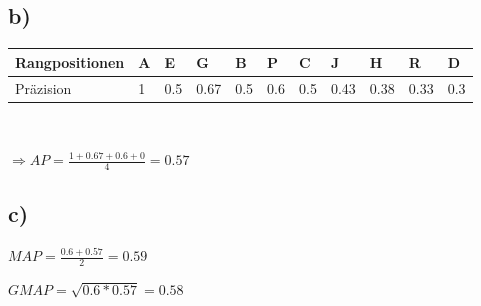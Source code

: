 \documentclass[11pt,a4paper,parskip=half ]{scrartcl}
\begin{document}
	\subsection*{b)}
	
	\begin{table}[h]
		\begin{tabular}{|l|l|l|l|l|l|l|l|l|l|l|}
			\hline
			Rangpositionen     & A & E   & G    & B   & P   & C   & J    & H    & R    & D   \\ \hline
			Präzision               & 1 & 0.5 & 0.67 & 0.5 & 0.6 & 0.5 & 0.43 & 0.38 & 0.33 & 0.3 \\ \hline
		\end{tabular}\\[0.5cm]
	\end{table}
	
	$\Rightarrow AP = \frac{1+0.67+0.6+0}{4} = 0.57$
	
	\subsection*{c)}
	
	$MAP = \frac{0.6 + 0.57}{2} = 0.59$
	
	$GMAP = \sqrt{0.6 * 0.57} = 0.58$	

	
\end{document}
